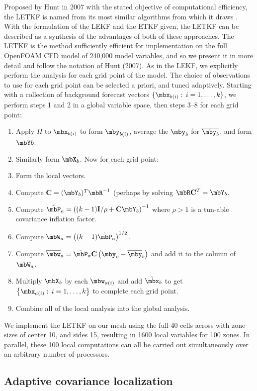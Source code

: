 Proposed by Hunt in 2007 with the stated objective of computational efficiency, the LETKF is named from its most similar algorithms from which it draws \cite{hunt2007efficient}.
With the formulation of the LEKF and the ETKF given, the LETKF can be  described as a synthesis of the advantages of both of these approaches.
The LETKF is the method sufficiently efficient for implementation on the full OpenFOAM CFD model of 240,000 model variables, and so we present it in more detail and follow the notation of Hunt \etal (2007). 
As in the LEKF, we explicitly perform the analysis for each grid point of the model.
The choice of observations to use for each grid point can be selected a priori, and tuned adaptively.
Starting with a collection of background forecast vectors $\{ \mbx_{b(i)}:\,i=1,\ldots,k \}$, we perform steps 1 and 2 in a global variable space, then steps 3--8 for each grid point:
\begin{enumerate}
\item Apply $H$ to $\mbx_{b(i)}$ to form $\mby_{b(i)}$, average the $\mby_b$ for $\overline{\mby_b}$, and form $\mbY b$.
\item Similarly form $\mbX_b$. Now for each grid point:
\item Form the local vectors.
\item Compute $\mathbf{C}=(\mbY_b)^T\mbR^{-1}$ (perhaps by solving $\mbR \mathbf{C}^T = \mbY_b$.
\item Compute $\tilde{\mbP}_a = \left( (k-1)\mathbf{I} / \rho + \mathbf{C} \mbY _b \right ) ^{-1}$ where $\rho > 1$ is a tun-able covariance inflation factor.
\item Compute $\mbW_a = \left ( (k-1) \tilde{\mbP} _a \right ) ^{1/2}$.
\item Compute $\overline{\mbw} _a  = \tilde{\mbP}_a \mathbf{C} \left ( \mby_o - \overline{\mby} _b \right )$ and add it to the column of $\mbW_a$.
\item Multiply $\mbX_b$ by each $\mbw_{a(i)}$ and add $\tilde{\mbx}_b$ to get $\left\{ \mbx_{a(i)}:\,i=1,\ldots,k\right \}$ to complete each grid point.
\item Combine all of the local analysis into the global analysis.
\end{enumerate}
We implement the LETKF on our mesh using the full 40 cells across with zone sizes of center 10, and sides 15, resulting in 1600 local variables for 100 zones.
In parallel, these 100 local computations can all be carried out simultaneously over an arbitrary number of processors.

\subsection{Adaptive covariance localization}

